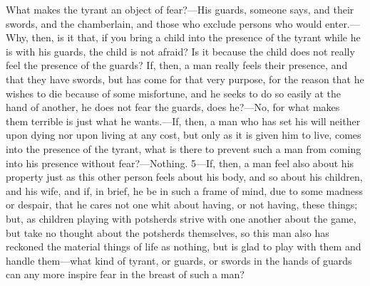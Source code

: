 What makes the tyrant an object of fear?—His guards, someone says, and their swords, and the chamberlain, and those who exclude persons who would enter.—Why, then, is it that, if you bring a child into the presence of the tyrant while he is with his guards, the child is not afraid? Is it because the child does not really feel the presence of the guards? If, then, a man really feels their presence, and that they have swords, but has come for that very purpose, for the reason that he wishes to die because of some misfortune, and he seeks to do so easily at the hand of another, he does not fear the guards, does he?—No, for what makes them terrible is just what he wants.—If, then, a man who has set his will neither upon dying nor upon living at any cost, but only as it is given him to live, comes into the presence of the tyrant, what is there to prevent such a man from coming into his presence without fear?—Nothing. 5—If, then, a man feel also about his property just as this other person feels about his body, and so about his children, and his wife, and if, in brief, he be in such a frame of mind, due to some madness or despair, that he cares not one whit about having, or not having, these things; but, as children playing with potsherds strive with one another about the game, but take no thought about the potsherds themselves, so this man also has reckoned the material things of life as nothing, but is glad to play with them and handle them—what kind of tyrant, or guards, or swords in the hands of guards can any more inspire fear in the breast of such a man?

